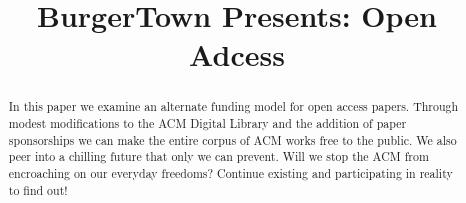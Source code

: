 \documentclass[sigtbd]{sigtbd17-style}
\begin{document}
\title{BurgerTown Presents: Open Adcess}
\maketitle

\begin{abstract}
  In this paper we examine an alternate funding model for open access papers.
  Through modest modifications to the ACM Digital Library and the addition of
  paper sponsorships we can make the entire corpus of ACM works free to the
  public.
  We also peer into a chilling future that only we can prevent.
  Will we stop the ACM from encroaching on our everyday freedoms?
  Continue existing and participating in reality to find out!
\end{abstract}













{}

\end{document}
